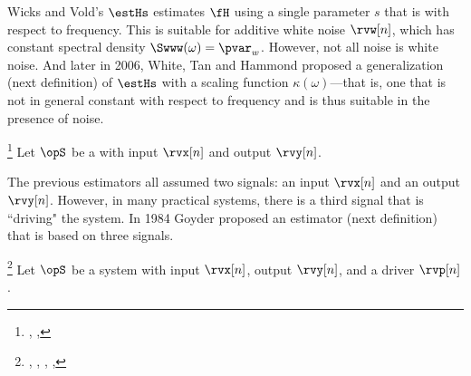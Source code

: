 Wicks and Vold's $\estHs$ estimates $\fH$ using a single parameter $s$
that is  with respect to frequency.
This is suitable for additive white noise $\rvw[n]$, which has constant spectral density 
$\Swww(\omega)=\pvar_w$.
However, not all noise is white noise.
And later in 2006, White, Tan and Hammond proposed a generalization (next definition) of $\estHs$ with a scaling 
function $\kappa(\omega)$---that is, one that is not in general constant with respect to frequency
and is thus suitable in the presence of  noise.
\begin{definition}
\footnote{
  ,
  ,
  }
\label{def:Hkappa}
Let $\opS$ be a  with input $\rvx[n]$ and output $\rvy[n]$.
\end{definition}

The previous estimators all assumed two signals: an input $\rvx[n]$ and an output $\rvy[n]$.
However, in many practical systems, there is a third signal that is ``driving" the system.
In 1984 Goyder proposed an estimator (next definition) that is based on three signals.
\begin{definition}
\footnote{
  ,
  ,
  ,
  ,
  }
\label{def:Hc}
Let $\opS$ be a system with input $\rvx[n]$, output $\rvy[n]$, and a driver $\rvp[n]$.
\end{definition}

